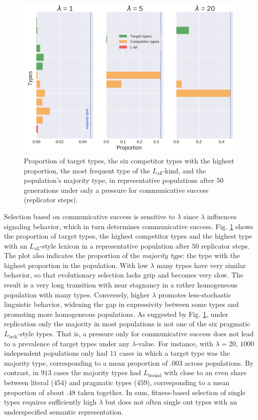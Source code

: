 \documentclass[a4paper, 11pt]{article}
\theoremstyle{Satz}
\newcommand{\mylang}[1]{\ensuremath{L_{\text{#1}}}\xspace} %
\newcommand{\Lall}{\mylang{all}}
\newcommand{\Lbound}{\mylang{bound}}
\newcommand{\Llack}{\mylang{lack}}
\begin{document}
\begin{figure}[t]
\centering
\includegraphics[width=\textwidth,height=8cm, keepaspectratio]{./plots/fig3}
\caption{Proportion of target types, the six competitor types with the highest proportion, the
  most frequent type of the $\Lall$-kind, and the population's majority type, in representative
  populations after $50$ generations under only a pressure for communicative success
  (replicator steps).}
\label{fig:only-R}
\end{figure}

Selection based on communicative success is sensitive to $\lambda$ since $\lambda$ influences
signaling behavior, which in turn determines communicative success. Fig. \ref{fig:only-R} shows
the proportion of target types, the highest competitor types and the highest type with an $\Lall$-style lexicon in a representative population after $50$ replicator steps. The plot also indicates the
proportion of the \emph{majority type}: the type with the highest proportion in the
population. With low $\lambda$ many types have very similar behavior, so that evolutionary
selection lacks grip and becomes very slow. The result is a very long transition with near
stagnancy in a rather homogeneous population with many types. Conversely, higher $\lambda$
promotes less-stochastic linguistic behavior, widening the gap in expressivity between some
types and promoting more homogeneous populations. As suggested by Fig. \ref{fig:only-R}, under replication only the majority in most populations is not one of the six pragmatic $\Llack$-style types. That is, a
pressure only for communicative success does not lead to a prevalence of target types under any
$\lambda$-value. For instance, with $\lambda = 20$, $1000$ independent populations only had $11$
cases in which a target type was the majority type, corresponding to a mean proportion of
$.003$ across populations. By contrast, in $913$ cases the majority types had $\Lbound$ with
close to an even share between literal ($454$) and pragmatic types ($459$), corresponding to a
mean proportion of about $.48$ taken together. In sum, fitness-based selection of single types
requires sufficiently high $\lambda$ but does not often single out types with an underspecified
semantic representation.
\end{document}
